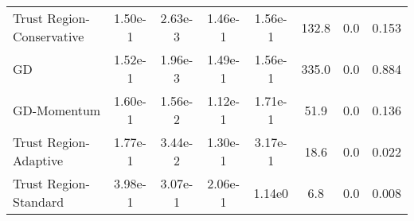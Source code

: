 \documentclass{article}
\begin{document}
\begin{table}[htbp]
{\begin{tabular}{l*{7}{S[table-format=2.2e-1]}}
Trust Region-Conservative & 1.50e-1 & 2.63e-3 & 1.46e-1 & 1.56e-1 & 132.8 & 0.0 & 0.153 \\
GD & 1.52e-1 & 1.96e-3 & 1.49e-1 & 1.56e-1 & 335.0 & 0.0 & 0.884 \\
GD-Momentum & 1.60e-1 & 1.56e-2 & 1.12e-1 & 1.71e-1 & 51.9 & 0.0 & 0.136 \\
Trust Region-Adaptive & 1.77e-1 & 3.44e-2 & 1.30e-1 & 3.17e-1 & 18.6 & 0.0 & 0.022 \\
Trust Region-Standard & 3.98e-1 & 3.07e-1 & 2.06e-1 & 1.14e0 & 6.8 & 0.0 & 0.008 \\
\bottomrule
\end{tabular}
}
\end{table}
\end{document}
